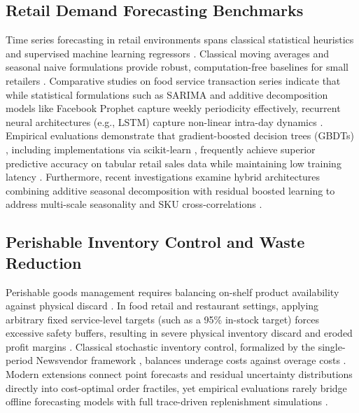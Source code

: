 \documentclass[conference]{IEEEtran}
\begin{document}
\subsection{Retail Demand Forecasting Benchmarks}
Time series forecasting in retail environments spans classical statistical heuristics and supervised machine learning regressors \cite{access2025supply, gartner2024automated}. Classical moving averages and seasonal naive formulations provide robust, computation-free baselines for small retailers \cite{susanto2023performance}. Comparative studies on food service transaction series indicate that while statistical formulations such as SARIMA and additive decomposition models like Facebook Prophet \cite{taylor2018forecasting} capture weekly periodicity effectively, recurrent neural architectures (e.g., LSTM) capture non-linear intra-day dynamics \cite{iccraids2026comparative, munawar2026lstm}. Empirical evaluations demonstrate that gradient-boosted decision trees (GBDTs) \cite{friedman2001greedy}, including implementations via scikit-learn \cite{pedregosa2011scikit}, frequently achieve superior predictive accuracy on tabular retail sales data while maintaining low training latency \cite{ganguly2024enhancing, sandeep2023smart, jatte2025optimization}. Furthermore, recent investigations examine hybrid architectures combining additive seasonal decomposition with residual boosted learning to address multi-scale seasonality and SKU cross-correlations \cite{iciptm2026predictive, ictmod2025state, iccraids2026evaluation}.

\subsection{Perishable Inventory Control and Waste Reduction}
Perishable goods management requires balancing on-shelf product availability against physical discard \cite{chowdhury2025predictive, iconstem2025aidriven}. In food retail and restaurant settings, applying arbitrary fixed service-level targets (such as a 95\% in-stock target) forces excessive safety buffers, resulting in severe physical inventory discard and eroded profit margins \cite{avuduri2025smartstock}. Classical stochastic inventory control, formalized by the single-period Newsvendor framework \cite{arrow1951optimal}, balances underage costs against overage costs \cite{cherian2025demand}. Modern extensions connect point forecasts and residual uncertainty distributions directly into cost-optimal order fractiles, yet empirical evaluations rarely bridge offline forecasting models with full trace-driven replenishment simulations \cite{chowdhury2025predictive}.
\end{document}
